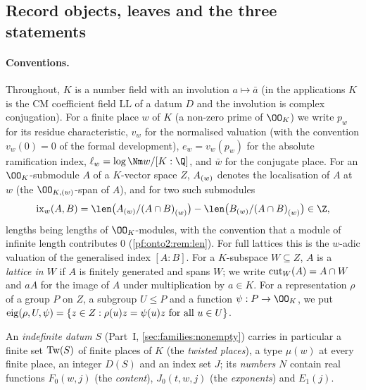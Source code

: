 \subsection{Record objects, leaves and the three statements}\label{sec:pf:onto2:setup}

\paragraph{Conventions.} Throughout, $K$ is a number field with an involution $a\mapsto\bar a$ (in the applications
$K$ is the CM coefficient field $\mathrm{LL}$ of a datum $D$ and the involution is complex conjugation). For a finite
place $w$ of $K$ (a non-zero prime of $\OO_K$) we write $p_w$ for its residue characteristic, $v_w$ for the normalised
valuation (with the convention $v_w(0)=0$ of the formal development), $e_w=v_w(p_w)$ for the absolute ramification
index, $\ell_w=\log\Nm w/[K:\Q]$, and $\bar w$ for the conjugate place. For an $\OO_K$-submodule $A$ of a $K$-vector
space $Z$, $\ontoIIloc{w}{A}$ denotes the localisation of $A$ at $w$ (the $\OO_{K,(w)}$-span of $A$), and for two such
submodules
\begin{equation}\label{eq:pf:onto2:ix}
\ontoIIix_w(A,B)=\len\bigl(\ontoIIloc{w}{A}/\ontoIIloc{w}{(A\cap B)}\bigr)-\len\bigl(\ontoIIloc{w}{B}/\ontoIIloc{w}{(A\cap B)}\bigr)\in\Z ,
\end{equation}
lengths being lengths of $\OO_K$-modules, with the convention that a module of infinite length contributes $0$
(\cref{pf:onto2:rem:len}). For full lattices this is the $w$-adic valuation of the generalised index $[A:B]$. For a
$K$-subspace $W\subseteq Z$, $A$ is a \emph{lattice in $W$} if $A$ is finitely generated and spans $W$; we write
$\ontoIIcut_W(A)=A\cap W$ and $aA$ for the image of $A$ under multiplication by $a\in K$. For a representation $\rho$ of a
group $P$ on $Z$, a subgroup $U\le P$ and a function $\psi:P\to\OO_K$, we put
$\ontoIIeig(\rho,U,\psi)=\{z\in Z:\rho(u)z=\psi(u)z\ \text{for all }u\in U\}$.

An \emph{indefinite datum} $S$ (Part~I, \cref{sec:families:nonempty}) carries in particular a finite set $\ontoIITw(S)$ of
finite places of $K$ (the \emph{twisted places}), a type $\mu(w)$ at every finite place, an integer $D(S)$ and an index
set $J$; its \emph{numbers} $N$ contain real functions $F_0(w,j)$ (the \emph{content}), $J_0(t,w,j)$ (the
\emph{exponents}) and $E_1(j)$.

